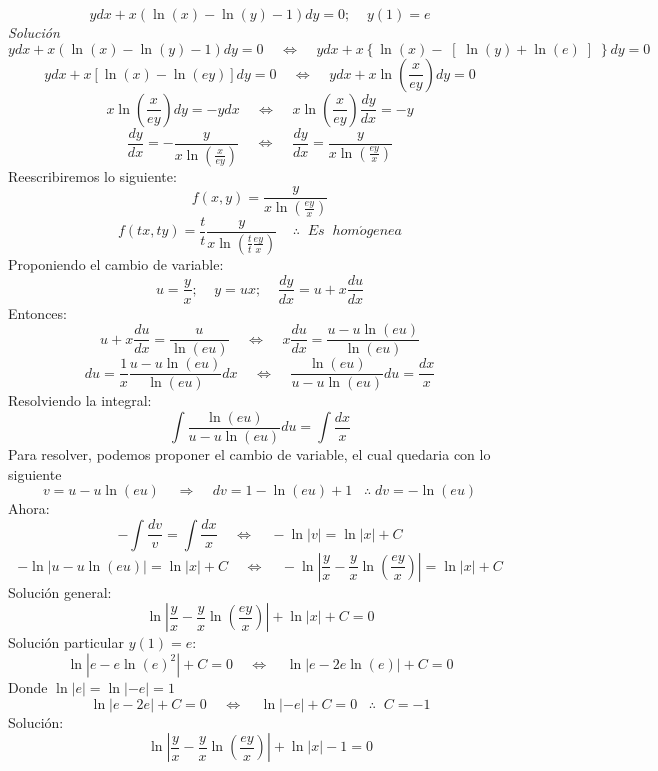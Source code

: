 \documentclass[10pt]{article}
\begin{document}
\clearpage
\[ydx+x\left(\ln(x)-\ln(y)-1\right)dy=0;\;\;\;\;y(1)=e\]
\textit{Solución}
\[ydx+x(\ln(x)-\ln(y)-1)dy=0\;\;\;\;\Leftrightarrow\;\;\;\;ydx+x\left\{\ln(x)-\right[\ln(y)+\ln(e)\left]\right\}dy=0\]
\[ydx+x\left[\ln(x)-\ln(ey)\right]dy=0\;\;\;\;\Leftrightarrow\;\;\;\;ydx+x\ln\left(\frac{x}{ey}\right)dy=0\]
\[x\ln\left(\frac{x}{ey}\right)dy=-ydx\;\;\;\;\Leftrightarrow\;\;\;\;x\ln\left(\frac{x}{ey}\right)\frac{dy}{dx}=-y\]
\[\frac{dy}{dx}=-\frac{y}{x\ln\left(\frac{x}{ey}\right)}\;\;\;\;\Leftrightarrow\;\;\;\;\frac{dy}{dx}=\frac{y}{x\ln\left(\frac{ey}{x}\right)}\]
Reescribiremos lo siguiente:
\[f(x,y)=\frac{y}{x\ln\left(\frac{ey}{x}\right)}\]
\[f(tx,ty)=\frac{t}{t}\frac{y}{x\ln\left(\frac{t}{t}\frac{ey}{x}\right)}\;\;\;\;\therefore\;\;Es\;\;hom\acute{o}genea\]
Proponiendo el cambio de variable:
\[u=\frac{y}{x};\;\;\;\;y=ux;\;\;\;\;\frac{dy}{dx}=u+x\frac{du}{dx}\]
Entonces:
\[u+x\frac{du}{dx}=\frac{u}{\ln(eu)}\;\;\;\;\Leftrightarrow\;\;\;\;x\frac{du}{dx}=\frac{u-u\ln(eu)}{\ln(eu)}\]
\[du=\frac{1}{x}\frac{u-u\ln(eu)}{\ln(eu)}dx\;\;\;\;\Leftrightarrow\;\;\;\;\frac{\ln(eu)}{u-u\ln(eu)}du=\frac{dx}{x}\]
Resolviendo la integral:
\[\int\frac{\ln(eu)}{u-u\ln(eu)}du=\int\frac{dx}{x}\]
Para resolver, podemos proponer el cambio de variable, el cual quedaria con lo siguiente
\[v=u-u\ln(eu)\;\;\;\;\Rightarrow\;\;\;\;dv=1-\ln(eu)+1\;\;\;\therefore\;dv=-\ln(eu)\]
Ahora:
\[-\int\frac{dv}{v}=\int\frac{dx}{x}\;\;\;\;\Leftrightarrow\;\;\;\;-\ln|v|=\ln|x|+C\]
\[-\ln|u-u\ln(eu)|=\ln|x|+C\;\;\;\;\Leftrightarrow\;\;\;\;-\ln\left|\frac{y}{x}-\frac{y}{x}\ln\left(\frac{ey}{x}\right)\right|=\ln|x|+C\]
Solución general:
\[\ln\left|\frac{y}{x}-\frac{y}{x}\ln\left(\frac{ey}{x}\right)\right|+\ln|x|+C=0\]
Solución particular $y(1)=e$:
\[\ln\left|e-e\ln(e)^{2}\right|+C=0\;\;\;\;\Leftrightarrow\;\;\;\;\ln\left|e-2e\ln(e)\right|+C=0\]
Donde $\ln|e|=\ln|-e|=1$
\[\ln|e-2e|+C=0\;\;\;\;\Leftrightarrow\;\;\;\;\ln|-e|+C=0\;\;\;\therefore\;\;C=-1\]
Solución:
\[\ln\left|\frac{y}{x}-\frac{y}{x}\ln\left(\frac{ey}{x}\right)\right|+\ln|x|-1=0\]
\clearpage
\end{document}
